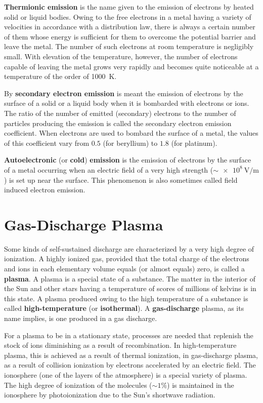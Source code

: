 \textbf{Thermionic emission} is the name given to the emission of electrons by heated solid or liquid bodies.
Owing to the free electrons in a metal having a variety of velocities in accordance with a distribution law, there is always a certain number of them whose energy is sufficient for them to overcome the potential barrier and leave the metal.
The number of such electrons at room temperature is negligibly small.
With elevation of the temperature, however, the number of electrons capable of leaving the metal grows very rapidly and becomes quite noticeable at a temperature of the order of \SI{1000}{\kelvin}.

By \textbf{secondary electron emission} is meant the emission of electrons by the surface of a solid or a liquid body when it is bombarded with electrons or ions.
The ratio of the number of emitted (secondary) electrons to the number of particles producing the emission is called the secondary electron emission coefficient.
When electrons are used to bombard the surface of a metal, the values of this coefficient vary from $0.5$ (for beryllium) to $1.8$ (for platinum).

\textbf{Autoelectronic} (or \textbf{cold}) \textbf{emission} is the emission of electrons by the surface of a metal occurring when an electric field of a very high strength ($\sim\SI{e8}{\volt\per\metre}$) is set up near the surface.
This phenomenon is also sometimes called field induced electron emission.

\section{Gas-Discharge Plasma}\label{sec:12_5}

Some kinds of self-sustained discharge are characterized by a very high degree of ionization.
A highly ionized gas, provided that the total charge of the electrons and ions in each elementary volume
equals (or almost equals) zero, is called a \textbf{plasma}.
A plasma is a special state of a substance.
The matter in the interior of the Sun and other stars having a temperature of scores of millions of kelvins is in this state.
A plasma produced owing to the high temperature of a substance is called \textbf{high-temperature} (or \textbf{isothermal}).
A \textbf{gas-discharge} plasma, as its name implies, is one produced in a gas discharge.

For a plasma to be in a stationary state, processes are needed that replenish the stock of ions diminishing as a result of recombination.
In high-temperature plasma, this is achieved as a result of thermal ionization, in gas-discharge plasma, as a result of collision ionization by electrons accelerated by an electric field.
The ionosphere (one of the layers of the atmosphere) is a special variety of plasma.
The high degree of ionization of the molecules ($\sim 1\%$) is maintained in the ionosphere by photoionization due to the Sun's shortwave radiation.

